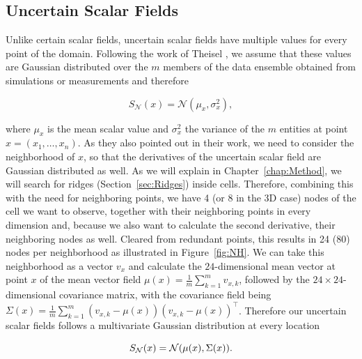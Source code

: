 \subsection{Uncertain Scalar Fields}\label{sec:USF}

Unlike certain scalar fields, uncertain scalar fields have multiple
values for every point of the domain. Following the work of Theisel
, we assume that these values are Gaussian
distributed over the $m$ members of the data ensemble obtained from
simulations or measurements and therefore

\begin{equation}
  S_{\mathcal{N}}(x) = \mathcal{N}(\mu_{x}, \sigma_{x}^2),
\end{equation}

\noindent where $\mu_x$ is the mean scalar value and $\sigma_{x}^2$ the
variance of the $m$ entities at point $x = (x_1,\dots,x_n)$. As they
also pointed out in their work, we need to consider the neighborhood of
$x$, so that the derivatives of the uncertain scalar field are Gaussian
distributed as well. As we will explain in Chapter~\ref{chap:Method}, we
will search for ridges (Section~\ref{sec:Ridges}) inside cells.
Therefore, combining this with the need for neighboring points, we have
4 (or 8 in the 3D case) nodes of the cell we want to observe, together
with their neighboring points in every dimension and, because we also
want to calculate the second derivative, their neighboring nodes as
well. Cleared from redundant points, this results in 24 (80) nodes per
neighborhood as illustrated in Figure~\ref{fig:NH}. We can take this
neighborhood as a vector $v_x$ and calculate the $24$-dimensional mean
vector at point $x$ of the mean vector field $\mu(x) = \frac{1}{m}
\sum_{k=1}^m v_{x,k}$, followed by the $24 \times 24$-dimensional
covariance matrix, with the covariance field being $\Sigma(x)= \frac{1}{m}
\sum_{k=1}^m (v_{x,k} - \mu(x)){(v_{x,k} - \mu{(x)})}^\top$. Therefore our
uncertain scalar fields follows a multivariate Gaussian distribution
at every location

\begin{equation}
  S_{\mathcal{N}}(x) = \mathcal{N}(\mu(x), \Sigma(x)).\\
\end{equation}

